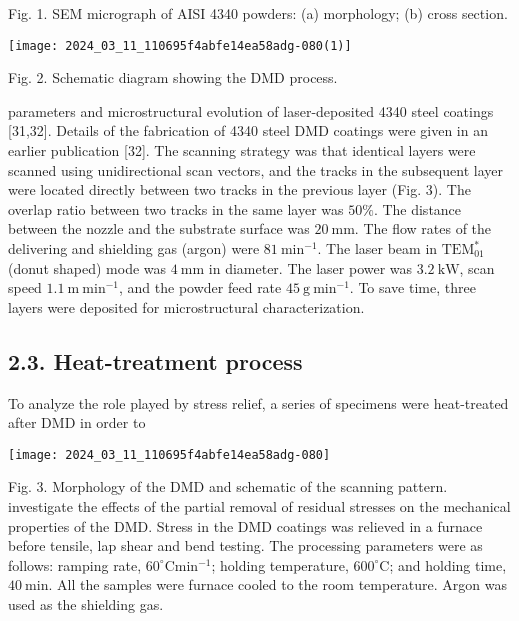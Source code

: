 \documentclass[10pt]{article}
\begin{document}
Fig. 1. SEM micrograph of AISI 4340 powders: (a) morphology; (b) cross section.

\begin{center}
\texttt{[image: 2024\_03\_11\_110695f4abfe14ea58adg-080(1)]}
\end{center}

Fig. 2. Schematic diagram showing the DMD process.

parameters and microstructural evolution of laser-deposited 4340 steel coatings [31,32]. Details of the fabrication of 4340 steel DMD coatings were given in an earlier publication [32]. The scanning strategy was that identical layers were scanned using unidirectional scan vectors, and the tracks in the subsequent layer were located directly between two tracks in the previous layer (Fig. 3). The overlap ratio between two tracks in the same layer was $50 \%$. The distance between the nozzle and the substrate surface was $20 \mathrm{~mm}$. The flow rates of the delivering and shielding gas (argon) were $81 \mathrm{~min}^{-1}$. The laser beam in $\mathrm{TEM}_{01}^{*}$ (donut shaped) mode was $4 \mathrm{~mm}$ in diameter. The laser power was $3.2 \mathrm{~kW}$, scan speed $1.1 \mathrm{~m} \mathrm{~min}^{-1}$, and the powder feed rate $45 \mathrm{~g} \mathrm{~min}^{-1}$. To save time, three layers were deposited for microstructural characterization.

\subsection*{2.3. Heat-treatment process}
To analyze the role played by stress relief, a series of specimens were heat-treated after DMD in order to

\begin{center}
\texttt{[image: 2024\_03\_11\_110695f4abfe14ea58adg-080]}
\end{center}

Fig. 3. Morphology of the DMD and schematic of the scanning pattern. investigate the effects of the partial removal of residual stresses on the mechanical properties of the DMD. Stress in the DMD coatings was relieved in a furnace before tensile, lap shear and bend testing. The processing parameters were as follows: ramping rate, $60^{\circ} \mathrm{C} \mathrm{min}{ }^{-1}$; holding temperature, $600^{\circ} \mathrm{C}$; and holding time, $40 \mathrm{~min}$. All the samples were furnace cooled to the room temperature. Argon was used as the shielding gas.
\end{document}
